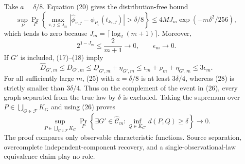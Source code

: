 Take \(a=\delta/8\).  Equation (20) gives the distribution-free bound
\[
 \sup_P\Pr_P\left\{
   \max_{v,j\leq J_m}
   |\widehat\phi_{v,j}-\phi_{P_v}(t_{k_v,j})|>\delta/8
 \right\}
 \leq4MJ_m\exp(-m\delta^2/256),
 \tag{26}
\]
which tends to zero because \(J_m=\lceil\log_2(m+1)\rceil\).  Moreover,
\[
 2^{1-J_m}\leq\frac{2}{m+1}\longrightarrow0,
 \qquad
 \epsilon_m\longrightarrow0.
 \tag{27}
\]
If \(G'\) is included, (17)--(18) imply
\[
 \widehat D_{G',m}
 \leq\overline D_{G',m}
 \leq\underline D_{G',m}+\eta_{G',m}
 \leq\epsilon_m+\rho_m+\eta_{G',m}
 \leq3\epsilon_m.
 \tag{28}
\]
For all sufficiently large \(m\), (25) with \(a=\delta/8\) is at least
\(3\delta/4\), whereas (28) is strictly smaller than \(3\delta/4\).
Thus on the complement of the event in (26), every graph separated from the
true law by \(\delta\) is excluded.  Taking the supremum over
\(P\in\bigcup_{G\in\mathcal F}K_G\) and using (26) proves
\[
 \sup_{P\in\bigcup_{G\in\mathcal F}K_G}
 \Pr_P\!\left\{\exists G'\in\widehat{\mathcal C}_m:
     \inf_{Q\in K_{G'}}d(P,Q)\geq\delta\right\}
 \longrightarrow0.
\]
The proof compares only observable characteristic functions.  Source
separation, overcomplete independent-component recovery, and a
single-observational-law equivalence claim play no role.
